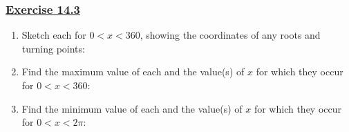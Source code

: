 \documentclass[
  11pt,
  openany]{book}
\begin{document}
\vspace{-0.5cm}

\label{ex143q}{}

\subsubsection*{\texorpdfstring{\hyperref[ex143a]{Exercise 14.3}}{Exercise 14.3}}\label{exercise-14.3}

\vspace{-0.3cm}

\begin{enumerate}
    \item Sketch each for $0<x<360$, showing the coordinates of any roots and turning points:
    \vspace{-0.2cm}
    \begin{enumerate}
    \end{enumerate}
    \item Find the maximum value of each and the value(s) of $x$ for which they occur for $0<x<360$:
    \vspace{-0.2cm}
    \begin{enumerate}
    \end{enumerate}
    \item Find the minimum value of each and the value(s) of $x$ for which they occur for $0<x<2\pi$:
    \vspace{-0.2cm}
    \begin{enumerate}
\end{enumerate}
\end{enumerate}
\end{document}
